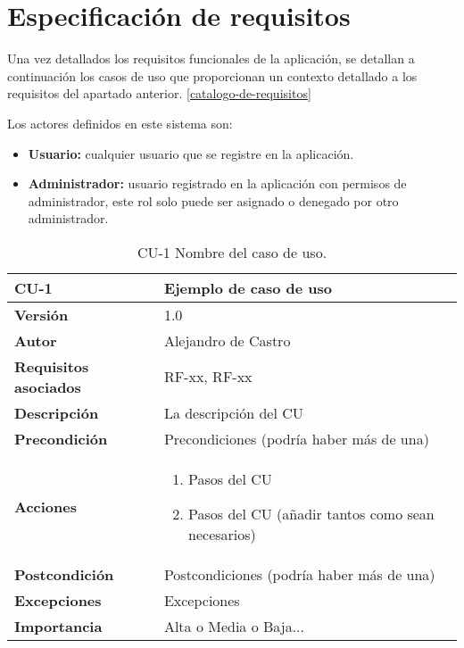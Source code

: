 \section{Especificación de requisitos}

Una vez detallados los requisitos funcionales de la aplicación, se detallan a continuación los casos de uso que proporcionan un contexto detallado a los requisitos del apartado anterior. \ref{catalogo-de-requisitos}

Los actores definidos en este sistema son:
\begin{itemize}
\tightlist
\item
    \textbf{Usuario:} cualquier usuario que se registre en la aplicación.
\item
    \textbf{Administrador:} usuario registrado en la aplicación con permisos de administrador, este rol solo puede ser asignado o denegado por otro administrador.
\end{itemize}


\begin{table}[p]
	\centering
	\begin{tabularx}{\linewidth}{ p{} p{} }
		\toprule
		\textbf{CU-1}    & \textbf{Ejemplo de caso de uso}\\
		\toprule
		\textbf{Versión}              & 1.0    \\
		\textbf{Autor}                & {Alejandro de Castro} \\
		\textbf{Requisitos asociados} & RF-xx, RF-xx \\
		\textbf{Descripción}          & La descripción del CU \\
		\textbf{Precondición}         & Precondiciones (podría haber más de una) \\
		\textbf{Acciones}             &
		\begin{enumerate}
			\def\labelenumi{\arabic{enumi}.}
			\tightlist
			\item Pasos del CU
			\item Pasos del CU (añadir tantos como sean necesarios)
		\end{enumerate}\\
		\textbf{Postcondición}        & Postcondiciones (podría haber más de una) \\
		\textbf{Excepciones}          & Excepciones \\
		\textbf{Importancia}          & Alta o Media o Baja... \\
		\bottomrule
	\end{tabularx}
	\caption{CU-1 Nombre del caso de uso.}
\end{table}